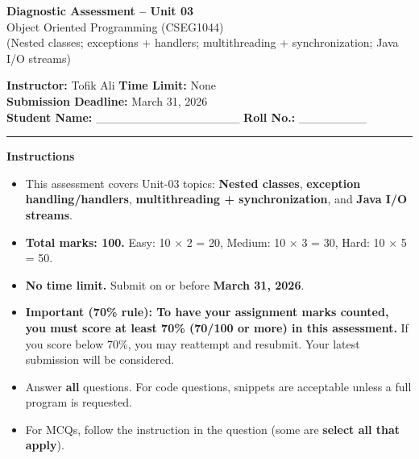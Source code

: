 \documentclass[11pt,a4paper]{article}
\begin{document}
\begin{center}
  {\LARGE \textbf{Diagnostic Assessment -- Unit 03}}\\[0.25em]
  {\large Object Oriented Programming (CSEG1044)}\\[0.25em]
  \normalsize (Nested classes; exceptions + handlers; multithreading + synchronization; Java I/O streams)
\end{center}

\noindent
\textbf{Instructor:} Tofik Ali \hfill \textbf{Time Limit:} None\\
\textbf{Submission Deadline:} March 31, 2026\\
\textbf{Student Name:} \_\_\_\_\_\_\_\_\_\_\_\_\_\_\_\_\_ \hfill \textbf{Roll No.:} \_\_\_\_\_\_\_\_\\

\vspace{0.6em}
\hrule
\vspace{0.8em}

\textbf{Instructions}
\begin{itemize}[leftmargin=*]
  \item This assessment covers Unit-03 topics:
    \textbf{Nested classes}, \textbf{exception handling/handlers}, \textbf{multithreading + synchronization},
    and \textbf{Java I/O streams}.
  \item \textbf{Total marks: 100.} Easy: 10 $\times$ 2 = 20, Medium: 10 $\times$ 3 = 30, Hard: 10 $\times$ 5 = 50.
  \item \textbf{No time limit.} Submit on or before \textbf{March 31, 2026}.
  \item \textbf{Important (70\% rule): To have your assignment marks counted, you must score at least 70\% (70/100 or more) in this assessment.}
    If you score below 70\%, you may reattempt and resubmit. Your latest submission will be considered.
  \item Answer \textbf{all} questions. For code questions, snippets are acceptable unless a full program is requested.
  \item For MCQs, follow the instruction in the question (some are \textbf{select all that apply}).
\end{itemize}

\vspace{0.6em}
\end{document}
